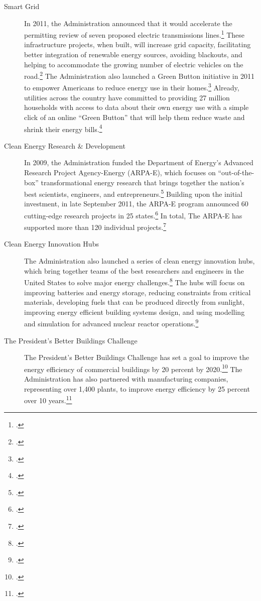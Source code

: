 \begin{description}
	\item [Smart Grid] In 2011, the Administration announced that it would accelerate the permitting review of seven proposed electric transmissions lines.\footcite[][]{GridModernization} These infrastructure projects, when built, will increase grid capacity, facilitating better integration of renewable energy sources, avoiding blackouts, and helping to accommodate the growing number of electric vehicles on the road.\footcite[][]{GridModernization} The Administration also launched a Green Button initiative in 2011 to empower Americans to reduce energy use in their homes.\footcite[][]{GreenButton} Already, utilities across the country have committed to providing 27 million households with access to data about their own energy use with a simple click of an online ``Green Button'' that will help them reduce waste and shrink their energy bills.\footcite[][]{GreenButton}
	\item [Clean Energy Research \& Development] In 2009, the Administration funded the Department of Energy’s Advanced Research Project Agency-Energy (ARPA-E), which focuses on “out-of-the-box” transformational energy research that brings together the nation’s best scientists, engineers, and entrepreneurs.\footcite[][]{ARPAE} Building upon the initial investment, in late September 2011, the ARPA-E program announced 60 cutting-edge research projects in 25 states.\footcite[][]{ARPAEProjects} In total, The ARPA-E has supported more than 120 individual projects.\footcite[][]{ARPAEProjects}
	\item [Clean Energy Innovation Hubs] The Administration also launched a series of clean energy innovation hubs, which bring together teams of the best researchers and engineers in the United States to solve major energy challenges.\footcite[][]{EnergyHubs} The hubs will focus on improving batteries and energy storage, reducing constraints from critical materials, developing fuels that can be produced directly from sunlight, improving energy efficient building systems design, and using modelling and simulation for advanced nuclear reactor operations.\footcite[][]{Hubs}
	\item [The President's Better Buildings Challenge] The President's Better Buildings Challenge has set a goal to improve the energy efficiency of commercial buildings by 20 percent by 2020.\footcite[][]{BetterBuildings} The Administration has also partnered with manufacturing companies, representing over 1,400 plants, to improve energy efficiency by 25 percent over 10 years.\footcite[][]{BetterBuildings}
\end{description}	



